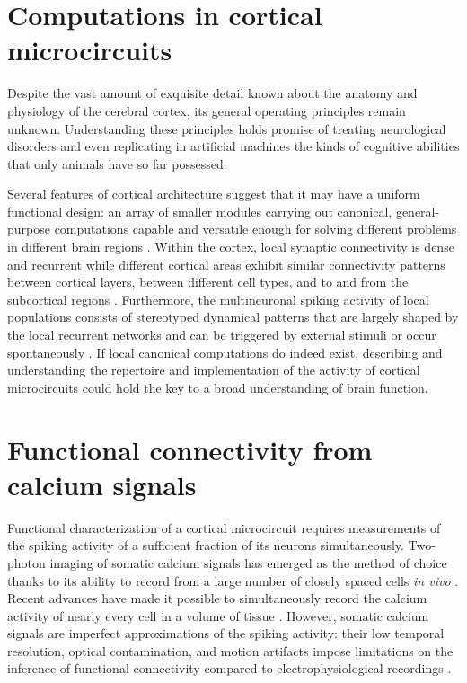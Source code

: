 \section{Computations in cortical microcircuits}
Despite the vast amount of exquisite detail known about the anatomy and physiology of the cerebral cortex, its general operating principles remain unknown. 
Understanding these principles holds promise of treating neurological disorders and even replicating in artificial machines the kinds of cognitive abilities that only animals have so far possessed.

Several features of cortical architecture suggest that it may have a uniform functional design: an array of smaller modules carrying out canonical, general-purpose computations capable and versatile enough for solving different problems in different brain regions \citep{Mountcastle:1997, Douglas:2007}. 
Within the cortex, local synaptic connectivity is dense and recurrent while different cortical areas exhibit similar connectivity patterns between cortical layers, between different cell types, and to and from the subcortical regions \citep{Douglas:2004,Harris:2013}. 
Furthermore, the multineuronal spiking activity of local populations consists of stereotyped dynamical patterns that are largely shaped by the local recurrent networks and can be triggered by external stimuli or occur spontaneously \citep{MacLean:2005,Luczak:2009,Harris:2011,Hofer:2011,Miller:2014}. 
If local canonical computations do indeed exist, describing and understanding the repertoire and implementation of the activity of cortical microcircuits could hold the key to a broad understanding of brain function.

\section{Functional connectivity from calcium signals}
Functional characterization of a cortical microcircuit requires measurements of the spiking activity of a sufficient fraction of its neurons simultaneously. 
Two-photon imaging of somatic calcium signals has emerged as the method of choice thanks to its ability to record from a large number of closely spaced cells \emph{in vivo} \citep{Stosiek:2003,Ko:2011,Ko:2013,Hofer:2011}. 
Recent advances have made it possible to simultaneously record the calcium activity of nearly every cell in a volume of tissue \citep{Reddy:2005, Katona:2012, Cotton:2013}. 
However, somatic calcium signals are imperfect approximations of the spiking activity: their low temporal resolution, optical contamination, and motion artifacts impose limitations on the inference of functional connectivity compared to electrophysiological recordings \citep{Gobel:2007,Grewe:2010}.


